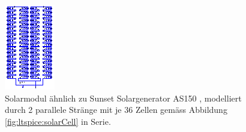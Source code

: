 \begin{figure}[h!tb]
    \centering
    \includegraphics[width=\textwidth]{images/ltspice/module-72cells--36x2.eps}
    \caption{%
        Solarmodul     \"ahnlich     zu    Sunset     Solargenerator     AS150
        \cite{ref:solar:as150}, modelliert durch 2  parallele Str\"ange mit je
        36 Zellen gem\"ass Abbildung \ref{fig:ltspice:solarCell} in Serie.%
    }
    \label{fig:ltspice:module:cellBased:36x2}
\end{figure}

